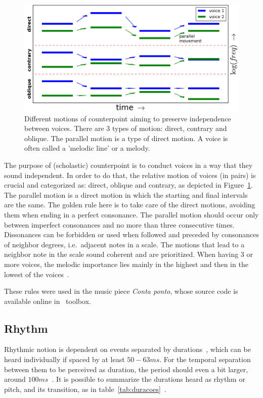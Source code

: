 \begin{figure}[h!]
    \centering
        \includegraphics[width=.8\columnwidth]{figures/movContraponto_}
    \caption{Different motions of counterpoint aiming to preserve independence
        between voices. There are 3 types of motion: direct, contrary and
        oblique. The parallel motion is a type of direct motion.
	A voice is often called a 'melodic line' or a melody.}
        \label{fig:movContraponto}
\end{figure}

The purpose of (scholastic) counterpoint is to conduct voices in a way that they sound independent. In order to do that, the relative motion of voices (in pairs) is crucial and
categorized as: direct, oblique and contrary, as depicted in Figure~\ref{fig:movContraponto}.
The parallel motion is a direct motion in which the starting and final intervals are the same.
The golden rule here is to take care of the direct motions, avoiding them
when ending in a perfect consonance. The parallel motion should occur only between
imperfect consonances and no more than three consecutive times. Dissonances can be forbidden or used when followed and preceded by consonances of neighbor
degrees, i.e.\ adjacent notes in a scale. The motions that lead to a
neighbor note in the scale sound coherent and are prioritized. When having 3 or more voices, the melodic
importance lies mainly in the highest and then in the lowest of the voices~\cite{Fux,Tragtenberg,SchoenbergContra}.

These rules were used in the music piece \emph{Conta ponto}, whose source code is
available online in \massa\ toolbox.

\subsection{Rhythm}\label{subsec:ritmo}
Rhythmic notion is dependent on events separated by durations~\cite{Lacerda}, which can be heard individually if spaced by at least $50-63ms$. For the temporal separation between them to be perceived as duration, the period should even a bit larger, around $100ms$~\cite{microsound}.
It is possible to summarize the durations heard as rhythm or pitch, and its transition,
as in table~\ref{tab:duracoes}~\cite{Alfaix, microsound}.

